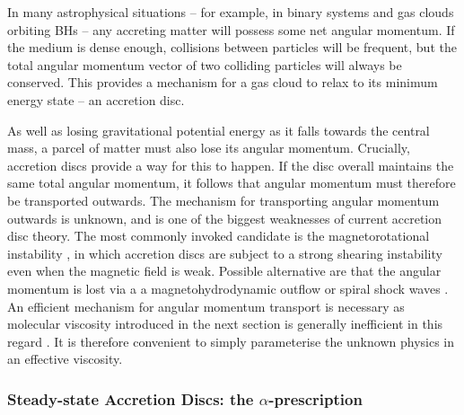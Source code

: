 In many astrophysical situations -- for example, 
in binary systems and gas clouds orbiting BHs --
any accreting matter will possess some net angular momentum.
If the medium is dense enough, collisions between particles will be
frequent, but the total angular momentum vector of two colliding particles
will always be conserved. This provides a mechanism for a gas cloud to relax to 
its minimum energy state -- an accretion disc. 

As well as losing gravitational potential energy as it falls towards 
the central mass, a parcel of matter must also lose its angular momentum. 
Crucially, accretion discs provide a way for this to happen. 
If the disc overall maintains the same total 
angular momentum, it follows that angular momentum must 
therefore be transported outwards. The mechanism for transporting 
angular momentum outwards is unknown, and is one of the biggest 
weaknesses of current accretion disc theory. The most commonly invoked
candidate is the magnetorotational instability \citep[MRI; ][]{balbus1991},
in which accretion discs are subject to a strong shearing instability even
when the magnetic field is weak. Possible alternative are
that the angular momentum is lost
via a a magnetohydrodynamic outflow \citep{blandfordpayne} or spiral shock waves
\citep{ju2016}. An efficient mechanism for angular momentum transport is 
necessary as molecular viscosity introduced in the next section is
generally inefficient in this regard \citep{pringle1991}. It is therefore
convenient to simply parameterise the unknown physics in 
an effective viscosity.





\subsubsection{Steady-state Accretion Discs: the $\alpha$-prescription}

